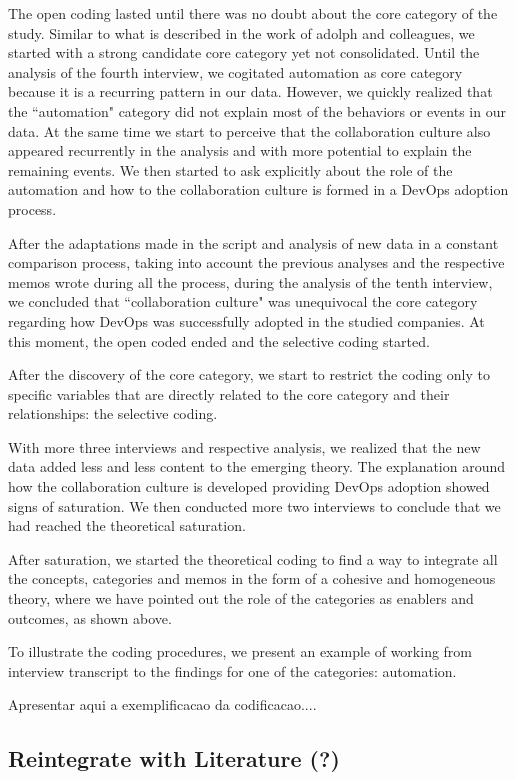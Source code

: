 The open coding lasted until there was no doubt about the core category of the
study. Similar to what is described in the work of adolph and colleagues\cite{adolph2012reconciling}, we  started with a strong candidate core category yet not consolidated. Until
the analysis of the fourth interview, we cogitated automation as core
category because it is a recurring pattern in our data. However, we quickly
realized that the ``automation" category did not explain most of the behaviors
or events in our data. At the same time we start to perceive that the
collaboration culture also appeared recurrently in the analysis and with more
potential to explain the remaining events. We then started to ask explicitly
about the role of the automation and how to the collaboration culture is formed
in a DevOps adoption process.

After the adaptations made in the script and analysis of new data in a constant
comparison process, taking into account the previous analyses and the
respective memos wrote during all the process, during the analysis of the tenth
interview, we concluded that ``collaboration culture" was unequivocal the core
category regarding how DevOps was
successfully adopted in the studied companies. At this moment, the open coded ended
and the selective coding started.

After the discovery of the core category, we start to restrict the coding only
to specific variables that are directly related to the core category and their
relationships: the selective coding.

With more three interviews and respective analysis, we realized that
the new data added less and less content to the emerging theory. The
explanation around how the collaboration culture is developed providing
DevOps adoption showed signs of saturation. We then conducted more two
interviews to conclude that we had reached the theoretical saturation.

After saturation, we started the theoretical coding to find a way to integrate
all the concepts, categories and memos in the form of a cohesive and
homogeneous theory, where we have pointed out the role of the categories as
enablers and outcomes, as shown above.

To illustrate the coding procedures, we present an example of working from
interview transcript to the findings for one of the categories: automation.


Apresentar aqui a exemplificacao da codificacao....

\subsection{Reintegrate with Literature (?)}
